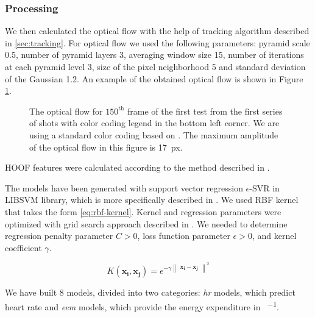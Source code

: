\subsubsection{Processing}
We then calculated the optical flow \cite{farneback2003two} with the help of tracking algorithm described in \ref{sec:tracking}. For optical flow we used the following parameters: pyramid scale \num{0.5}, number of pyramid layers \num{3}, averaging window size \num{15}, number of iterations at each pyramid level \num{3}, size of the pixel neighborhood \num{5} and standard deviation of the Gaussian \num{1.2}. An example of the obtained optical flow is shown in Figure \ref{fig:optical-flow}.

\begin{figure}[!htb]
	\centering
    \caption{The optical flow for $150^{\mathrm{th}}$ frame of the first test from the first series of shots with color coding legend in the bottom left corner. We are using a standard color coding based on \cite{baker2011database}. The maximum amplitude of the optical flow in this figure is \SI{17}{px}.}
    \label{fig:optical-flow}
\end{figure}

HOOF features were calculated according to the method described in \cite{chaudhry2009histograms}.

The models have been generated with support vector regression \mbox{$\epsilon$-SVR} in LIBSVM library, which is more specifically described in \cite{CC01a}. We used RBF kernel that takes the form \eqref{eq:rbf-kernel}. Kernel and regression parameters were optimized with grid search approach described in \cite{hsu2003practical}. We needed to determine  regression penalty parameter $C > 0$, loss function parameter $\epsilon > 0$, and kernel coefficient $\gamma$. 

\begin{equation} \label{eq:rbf-kernel}
		K(\mathbf{x_i}, \mathbf{x_j}) = e^{
        	-\gamma 
        	\begin{Vmatrix}
        		\mathbf{x_i} - \mathbf{x_j}
        	\end{Vmatrix}^2
        }
\end{equation}

We have built \num{8} models, divided into two categories: \textit{hr} models, which predict heart rate and \textit{eem} models, which provide the energy expenditure in \si{\kcal\per\min}.

